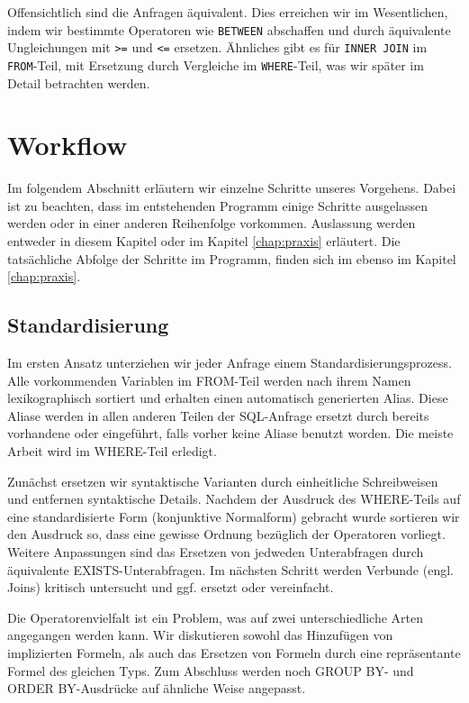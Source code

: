 Offensichtlich sind die Anfragen äquivalent. Dies erreichen wir im Wesentlichen, indem wir bestimmte Operatoren wie \verb|BETWEEN| abschaffen und durch äquivalente Ungleichungen mit \verb|>=| und \verb|<=| ersetzen. Ähnliches gibt es für \verb|INNER JOIN| im \verb|FROM|-Teil, mit Ersetzung durch Vergleiche im \verb|WHERE|-Teil, was wir später im Detail betrachten werden.

\section{Workflow}

Im folgendem Abschnitt erläutern wir einzelne Schritte unseres Vorgehens. Dabei ist zu beachten, dass im entstehenden Programm einige Schritte ausgelassen werden oder in einer anderen Reihenfolge vorkommen. Auslassung werden entweder in diesem Kapitel oder im Kapitel \ref{chap:praxis} erläutert. Die tatsächliche Abfolge der Schritte im Programm, finden sich im ebenso im Kapitel \ref{chap:praxis}.

\subsection{Standardisierung}

Im ersten Ansatz unterziehen wir jeder Anfrage einem Standardisierungsprozess. Alle vorkommenden Variablen im FROM-Teil werden nach ihrem Namen lexikographisch sortiert und erhalten einen automatisch generierten Alias. Diese Aliase werden in allen anderen Teilen der SQL-Anfrage ersetzt durch bereits vorhandene oder eingeführt, falls vorher keine Aliase benutzt worden. Die meiste Arbeit wird im WHERE-Teil erledigt. 

Zunächst ersetzen wir syntaktische Varianten durch einheitliche Schreibweisen und entfernen syntaktische Details. Nachdem der Ausdruck des WHERE-Teils auf eine standardisierte Form (konjunktive Normalform) gebracht wurde sortieren wir den Ausdruck so, dass eine gewisse Ordnung bezüglich der Operatoren vorliegt. Weitere Anpassungen sind das Ersetzen von jedweden Unterabfragen durch äquivalente EXISTS-Unterabfragen. Im nächsten Schritt werden Verbunde (engl. Joins) kritisch untersucht und ggf. ersetzt oder vereinfacht. 

Die Operatorenvielfalt ist ein Problem, was auf zwei unterschiedliche Arten angegangen werden kann. Wir diskutieren sowohl das Hinzufügen von implizierten Formeln, als auch das Ersetzen von Formeln durch eine repräsentante Formel des gleichen Typs. Zum Abschluss werden noch GROUP BY- und ORDER BY-Ausdrücke auf ähnliche Weise angepasst.

